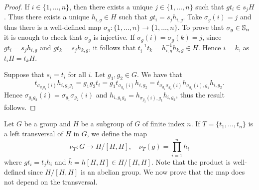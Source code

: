 \begin{proof}
	If $i\in\{1,\dots,n\}$, then there exists a unique $j\in\{1,\dots,n\}$ such that $gt_i\in
	s_jH$. Thus there exists a unique $h_{i,g}\in H$ such that $gt_i=s_jh_{i,g}$. Take 
	$\sigma_g(i)=j$ and thus there is a well-defined map 
	$\sigma_g\colon\{1,\dots,n\}\to\{1,\dots,n\}$.  To prove that 
	$\sigma_g\in\mathbb{S}_n$ it is enough to check that $\sigma_g$ is injective. If
	$\sigma_g(i)=\sigma_g(k)=j$, since $gt_i=s_jh_{i,g}$ and $gt_k=s_jh_{k,g}$, it follows that 
	$t_i^{-1}t_k=h_{i,g}^{-1}h_{k,g}\in H$. Hence $i=k$, as $t_iH=t_kH$.
	
	Suppose that $s_i=t_i$ for all $i$. Let $g_1,g_2\in G$. We have that
	\[t_{\sigma_{g_1g_2}(i)}h_{i,g_1g_2}=g_1g_2t_i=g_1t_{\sigma_{g_2}(i)}h_{i,g_2}=t_{\sigma_{g_1}\sigma_{g_2}(i)}h_{\sigma_{g_2}(i),g_1}h_{i,g_2}.\]
	Hence $\sigma_{g_1g_2}(i)=\sigma_{g_1}\sigma_{g_2}(i)$ and  $h_{i,g_1g_2}=h_{\sigma_{g_2}(i),g_1}h_{i,g_2}$, thus the result follows.
\end{proof}

%
%
%


Let $G$ be a group and $H$ be a subgroup of $G$ of finite index $n$. If
$T=\{t_1,\dots,t_n\}$ is a left transversal of $H$ in $G$, we define the map 
	\[
		\nu_T\colon G\to H/[H,H],\quad
		\nu_T(g)=\prod_{i=1}^n \bar h_i
	\]
where $gt_i=t_jh_i$ and $\bar h=h[H,H]\in H/[H,H]$. Note that the product is well-defined since $H/[H,H]$ is an abelian group. 
We now prove that the map does not depend on the 
transversal. 

